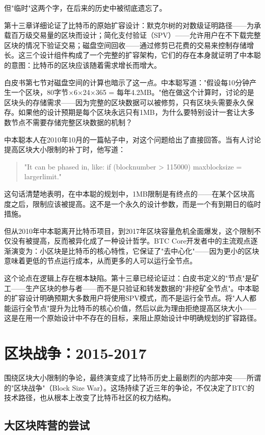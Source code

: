 \documentclass[a4paper,12pt,openany]{ctexbook}
\begin{document}
但"临时"这两个字，在后来的历史中被彻底遗忘了。

第十三章详细论证了比特币的原始扩容设计：默克尔树的对数级证明路径——为承载百万级交易量的区块而设计；简化支付验证（SPV）——允许用户在不下载完整区块的情况下验证交易；磁盘空间回收——通过修剪已花费的交易来控制存储增长。这三个设计组件构成了一个完整的扩容架构，它们的存在本身就证明了中本聪的意图：比特币的区块应该随着需求增长而增大。

白皮书第七节对磁盘空间的计算也暗示了这一点。中本聪写道："假设每10分钟产生一个区块，80字节×6×24×365 = 每年4.2MB。"他在做这个计算时，讨论的是区块头的存储需求——因为完整的区块数据可以被修剪，只有区块头需要永久保存。如果他的设计预期是每个区块永远只有1MB，为什么要特别设计一套让大多数节点不需要存储完整区块数据的机制？

中本聪本人在2010年10月的一篇帖子中，对这个问题给出了直接回答。当有人讨论提高区块大小限制的补丁时，他写道：


\begin{quote}
"It can be phased in, like: if (blocknumber > 115000) maxblocksize = largerlimit."
\end{quote}


这句话清楚地表明，在中本聪的规划中，1MB限制是有终点的——在某个区块高度之后，限制应该被提高。这不是一个永久的设计参数，而是一个有到期日的临时措施。

但从2010年中本聪离开比特币项目，到2017年区块容量危机全面爆发，这个限制不仅没有被提高，反而被异化成了一种设计哲学。BTC Core开发者中的主流观点逐渐演变为：小区块是比特币的核心特性，它保证了"去中心化"——因为更小的区块意味着更低的节点运行成本，从而更多的人可以运行全节点。

这个论点在逻辑上存在根本缺陷。第十三章已经论证过：白皮书定义的"节点"是矿工——生产区块的参与者——而不是只验证和转发数据的"非挖矿全节点"。中本聪的扩容设计明确预期大多数用户将使用SPV模式，而不是运行全节点。将"人人都能运行全节点"提升为比特币的核心价值，然后以此为理由拒绝提高区块大小——这是在用一个原始设计中不存在的目标，来阻止原始设计中明确规划的扩容路径。


\section*{区块战争：2015-2017}


围绕区块大小限制的争论，最终演变成了比特币历史上最剧烈的内部冲突——所谓的"区块战争"（Block Size War）。这场持续了近三年的争论，不仅决定了BTC的技术路径，也从根本上改变了比特币社区的权力结构。


\subsection*{大区块阵营的尝试}
\end{document}
